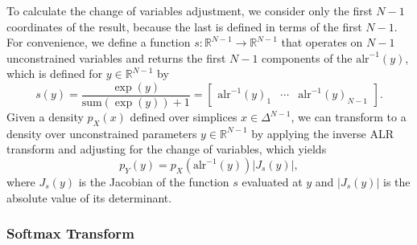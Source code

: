 \documentclass[11pt]{article}
\newcommand{\abs}[1]{\left| #1 \right|}
\newcommand{\absdet}[1]{\abs{#1}}
\begin{document}
To calculate the change of variables adjustment, we consider only the
first $N-1$ coordinates of the result, because the last is defined in
terms of the first $N-1$.  For convenience, we define a function 
$s:\mathbb{R}^{N-1} \rightarrow \mathbb{R}^{N-1}$ that operates on
$N-1$ unconstrained variables and returns the first $N-1$ components
of the $\textrm{alr}^{-1}(y)$, which is
defined for $y \in \mathbb{R}^{N-1}$ by
\[
  s(y) = \frac{\exp(y)}{\textrm{sum}(\exp(y)) + 1}
  = \begin{bmatrix}
    \textrm{alr}^{-1}(y)_1
    & \cdots &
    \textrm{alr}^{-1}(y)_{N-1}
    \end{bmatrix}.
\]
Given a density $p_X(x)$ defined over simplices $x \in \Delta^{N-1}$,
we can transform to a density over unconstrained parameters $y \in
\mathbb{R}^{N-1}$ by applying the inverse ALR transform and adjusting
for the change of variables, which yields
\[
  p_Y(y) = p_X(\textrm{alr}^{-1}(y)) \absdet{J_{s}(y)},
\]
where $J_{s}(y)$ is the Jacobian of the function $s$ evaluated at $y$
and $\absdet{J_s(y)}$ is the absolute value of its determinant.


\subsubsection{Softmax Transform}
\end{document}
